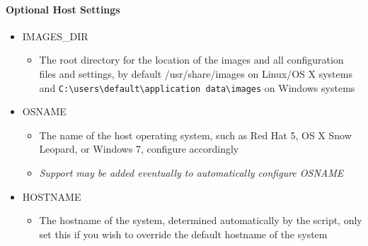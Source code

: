 \paragraph*{Optional Host Settings}
\begin{itemize}
\item	IMAGES\_DIR
		\begin{itemize}
		\item	The root directory for the location of the \cernvm images and all
				configuration files and settings, by default /usr/share/images on
				Linux/OS X systems and \verb|C:\users\default\application data\images|
				on Windows systems
		\end{itemize}
		
\item	OSNAME
		\begin{itemize}
		\item	The name of the host operating system, such as Red Hat 5, OS X
				Snow Leopard, or Windows 7, configure accordingly
		\item	\emph{Support may be added eventually to automatically configure OSNAME}
		\end{itemize}
		
\item	HOSTNAME
		\begin{itemize}
		\item	The hostname of the system, determined automatically by the script,
				only set this if you wish to override the default hostname of the
				system
		\end{itemize}
\end{itemize}